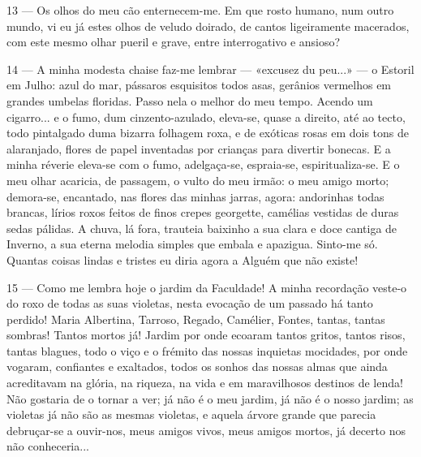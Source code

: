 13 — Os olhos do meu cão enternecem-me. Em que
rosto humano, num outro mundo, vi eu já estes olhos
de veludo doirado, de cantos ligeiramente macerados,
com este mesmo olhar pueril e grave, entre interrogativo e ansioso?

14 — A minha modesta chaise faz-me lembrar — 
«excusez du peu...» — o Estoril em Julho: azul do mar,
pássaros esquisitos todos asas, gerânios vermelhos em
grandes umbelas floridas. Passo nela o melhor do meu
tempo. Acendo um cigarro... e o fumo, dum cinzento-azulado, eleva-se, quase a direito, até ao tecto, todo pintalgado duma bizarra folhagem roxa, e de exóticas rosas em dois tons de alaranjado, flores de papel inventadas por crianças para divertir bonecas. E a minha réverie eleva-se com o fumo, adelgaça-se, espraia-se, espiritualiza-se. E o meu olhar acaricia, de passagem, o vulto do meu irmão: o meu amigo morto; demora-se, encantado, nas flores das minhas jarras, agora: andorinhas todas brancas, lírios roxos feitos de finos crepes georgette, camélias vestidas de duras sedas
pálidas. A chuva, lá fora, trauteia baixinho a sua clara
e doce cantiga de Inverno, a sua eterna melodia simples
que embala e apazigua. Sinto-me só. Quantas coisas
lindas e tristes eu diria agora a Alguém que não
existe!

15 — Como me lembra hoje o jardim da Faculdade!
A minha recordação veste-o do roxo de todas as suas
violetas, nesta evocação de um passado há tanto 
perdido! Maria Albertina, Tarroso, Regado, Camélier,
Fontes, tantas, tantas sombras! Tantos mortos já!
Jardim por onde ecoaram tantos gritos, tantos risos, tantas blagues, todo o viço e o frémito das nossas inquietas mocidades, por onde vogaram, confiantes e exaltados, todos os sonhos das nossas almas que ainda acreditavam na glória, na riqueza, na vida e em maravilhosos destinos de lenda! Não gostaria de o tornar a ver; já não é o meu jardim, já não é o nosso jardim; as violetas já não são as mesmas violetas, e aquela árvore grande que parecia debruçar-se a ouvir-nos, meus amigos vivos, meus amigos mortos, já decerto nos não
conheceria...

